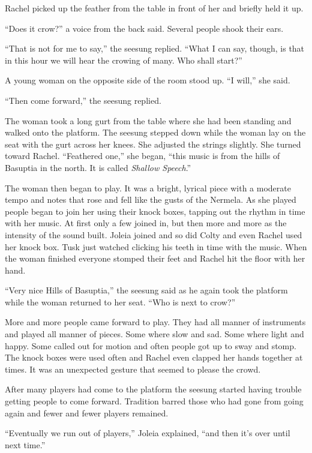 Rachel picked up the feather from the table in front of her and briefly held it up.

``Does it crow?'' a voice from the back said. Several people shook their ears.

``That is not for me to say,'' the seesung replied. ``What I can say, though, is that in this
hour we will hear the crowing of many. Who shall start?''

A young woman on the opposite side of the room stood up. ``I will,'' she said.

``Then come forward,'' the seesung replied.

The woman took a long gurt from the table where she had been standing and walked onto the
platform. The seesung stepped down while the woman lay on the seat with the gurt across her
knees. She adjusted the strings slightly. She turned toward Rachel. ``Feathered one,'' she
began, ``this music is from the hills of Basuptia in the north. It is called \textit{Shallow
  Speech}.''

The woman then began to play. It was a bright, lyrical piece with a moderate tempo and notes
that rose and fell like the gusts of the Nermela. As she played people began to join her using
their knock boxes, tapping out the rhythm in time with her music. At first only a few joined in,
but then more and more as the intensity of the sound built. Joleia joined and so did Colty and
even Rachel used her knock box. Tusk just watched clicking his teeth in time with the music.
When the woman finished everyone stomped their feet and Rachel hit the floor with her hand.

``Very nice Hills of Basuptia,'' the seesung said as he again took the platform while the woman
returned to her seat. ``Who is next to crow?''

More and more people came forward to play. They had all manner of instruments and played all
manner of pieces. Some where slow and sad. Some where light and happy. Some called out for
motion and often people got up to sway and stomp. The knock boxes were used often and Rachel
even clapped her hands together at times. It was an unexpected gesture that seemed to please the
crowd.

After many players had come to the platform the seesung started having trouble getting people to
come forward. Tradition barred those who had gone from going again and fewer and fewer players
remained.

``Eventually we run out of players,'' Joleia explained, ``and then it's over until next time.''

